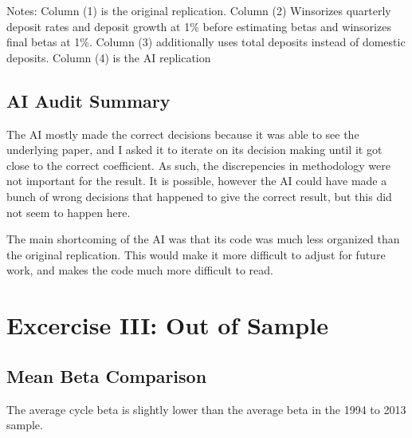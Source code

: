 \documentclass[11pt]{article}
\begin{document}
\begin{table}[htbp]
    \centering
    \caption{Deposit-$\beta$ on spread-$\beta$: methodology comparison}
    \label{tab:ai_methodology_comparison}
    \resizebox{\textwidth}{!}{%
    }
    \par\smallskip
    \begin{minipage}{\textwidth}
        \footnotesize
        Notes: Column (1) is the original replication. Column (2) Winsorizes quarterly deposit rates and deposit growth at 1\% before estimating betas and winsorizes final betas at 1\%. Column (3) additionally uses total deposits instead of domestic deposits. Column (4) is the AI replication
    \end{minipage}
\end{table}

\subsection{AI Audit Summary}

The AI mostly made the correct decisions because it was able to see the underlying paper, and I asked it to iterate on its decision making until it got close to the correct coefficient. As such, the discrepencies in methodology were not important for the result. It is possible, however the AI could have made a bunch of wrong decisions that happened to give the correct result, but this did not seem to happen here. 

The main shortcoming of the AI was that its code was much less organized than the original replication. This would make it more difficult to adjust for future work, and makes the code much more difficult to read.

\section{Excercise III: Out of Sample}


\subsection{Mean Beta Comparison}

The average cycle beta is slightly lower than the average beta in the 1994 to 2013 sample.

\begin{table}[H]
    \centering
    \caption{Mean spreads}
    \label{tab:mean_betas}
    
\end{table}
\end{document}
